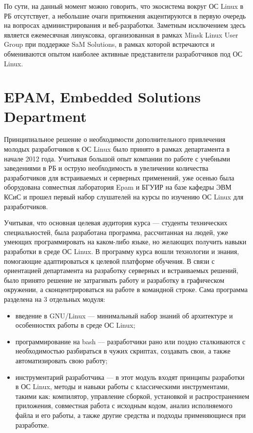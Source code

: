 \documentclass[10pt, a5paper]{article}
\begin{document}
По сути, на данный момент можно говорить, что экосистема вокруг ОС Linux в РБ отсутствует, а небольшие очаги притяжения акцентируются в первую очередь на вопросах администрирования и веб-разработки. Заметным исключением здесь является ежемесячная линуксовка, организованная в рамках Minsk Linux User Group при поддержке SaM Solutions, в рамках которой встречаются и обмениваются опытом наиболее активные представители разработчиков под ОС Linux.

\section{EPAM, Embedded Solutions Department}

Принципиальное решение о необходимости дополнительного привлечения молодых разработчиков к ОС Linux было принято в рамках департамента в начале 2012 года. Учитывая большой опыт компании по работе с учебными заведениями в РБ и острую необходимость в увеличении количества разработчиков для встраиваемых и серверных применений, уже осенью была оборудована совместная лаборатория Epam и БГУИР на базе кафедры ЭВМ КСиС и прошел первый набор слушателей на курсы по изучению ОС Linux для разработчиков.

Учитывая, что основная целевая аудитория курса --- студенты технических специальностей, была разработана программа, рассчитанная на людей, уже умеющих программировать на каком-либо языке, но желающих получить навыки разработки в среде ОС Linux. В программу курса вошли технологии и знания, помогающие адаптироваться к целевой платформе обучения.
В связи с ориентацией департамента на разработку серверных и встраиваемых решений, было принято решение не затрагивать работу и разработку в графическом окружении, а сконцентрироваться на работе в командной строке.
Сама программа разделена на 3 отдельных модуля:

\begin{itemize}
  \item введение в GNU/Linux --- минимальный набор знаний об архитектуре и особенностях работы в среде ОС Linux;
  \item программирование на bash --- разработчики рано или поздно сталкиваются с необходимостью разбираться в чужих скриптах, создавать свои, а также автоматизировать свою работу;
  \item инструментарий разработчика --- в этот модуль входят принципы разработки в ОС Linux, методы и навыки работы с классическими инструментами, такими как: компилятор, управление сборкой, установкой и распространением приложения, совместная работа с исходным кодом, анализ исполняемого файла и его работы, а также другие средства и подходы применяющиеся при разработке.
\end{itemize}
\end{document}
